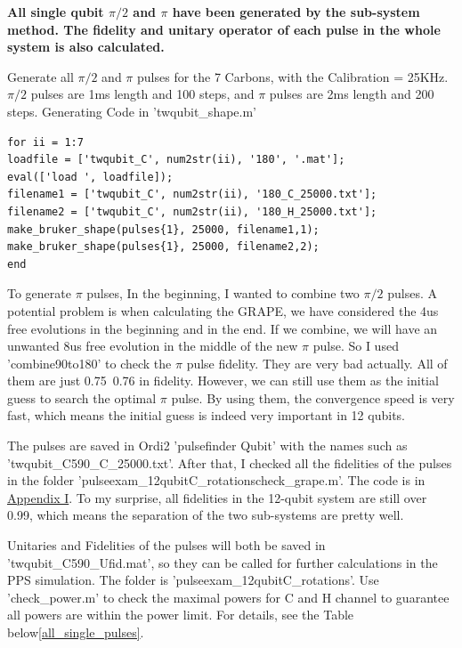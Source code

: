 \textbf{All single qubit $\pi/2$ and $\pi$ have been generated by the sub-system method. The fidelity and unitary operator of each pulse in the whole system is also calculated.}

Generate all $\pi/2$ and $\pi$ pulses for the 7 Carbons, with the Calibration = 25KHz. $\pi/2$ pulses are 1ms length and 100 steps, and $\pi$ pulses are 2ms length and 200 steps. Generating Code in 'twqubit\_shape.m'

\begin{lstlisting}
for ii = 1:7
loadfile = ['twqubit_C', num2str(ii), '180', '.mat'];
eval(['load ', loadfile]);
filename1 = ['twqubit_C', num2str(ii), '180_C_25000.txt'];
filename2 = ['twqubit_C', num2str(ii), '180_H_25000.txt'];
make_bruker_shape(pulses{1}, 25000, filename1,1);
make_bruker_shape(pulses{1}, 25000, filename2,2);
end
\end{lstlisting}

To generate $\pi$ pulses, In the beginning, I wanted to combine two $\pi/2$ pulses. A potential problem is when calculating the GRAPE, we have considered the 4us free evolutions in the beginning and in the end. If we combine, we will have an unwanted 8us free evolution in the middle of the new $\pi$ pulse. So I used 'combine90to180' to check the $\pi$ pulse fidelity. They are very bad actually. All of them are just 0.75~0.76 in fidelity. However, we can still use them as the initial guess to search the optimal $\pi$ pulse. By using them, the convergence speed is very fast, which means the initial guess is indeed very important in 12 qubits.

The pulses are saved in Ordi2 '\dir pulsefinder Qubit\dir' with the names such as 'twqubit\_C590\_C\_25000.txt'. After that,
I checked all the fidelities of the pulses in the folder '\dir pulseexam\_12qubit\dir C\_rotations\dir check\_grape.m'. The code is in \hyperlink{code:check_grape}{Appendix I}. To my surprise, all fidelities in the 12-qubit system are still over 0.99, which means the separation of the two sub-systems are pretty well.

Unitaries and Fidelities of the pulses will both be saved in 'twqubit\_C590\_Ufid.mat', so they can be called for further calculations in the PPS simulation. The folder is '\dir pulseexam\_12qubit\dir C\_rotations\dir'. Use 'check\_power.m' to check the maximal powers for C and H channel to guarantee all powers are within the power limit. For details, see the Table below\ref{all_single_pulses}.

